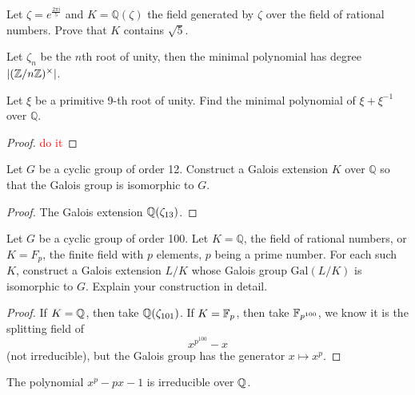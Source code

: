 \begin{prob}[S2002-Q5]
    Let \(\zeta = e^{\frac{2\pi i}{5}}\) and \(K = \mathbb{Q}(\zeta)\) the field generated by \(\zeta\) over the field of rational numbers. Prove that \(K\) contains \(\sqrt{5}\).
\end{prob}

\begin{prop}
    Let $\zeta_n$ be the $n$th root of unity, then the minimal polynomial has degree $|(\mathbb{Z}/n\mathbb{Z})^\times|$. 
\end{prop}

\begin{prob}[S2008-Q2]
    Let \(\xi\) be a primitive 9-th root of unity. Find the minimal polynomial of \(\xi + \xi^{-1}\) over \(\mathbb{Q}\).
\end{prob}
\begin{proof}
    \textcolor{red}{do it}
\end{proof}

\begin{prob}[F2007-Q1]
    Let \(G\) be a cyclic group of order 12. Construct a Galois extension \(K\) over \(\mathbb{Q}\) so that the Galois group is isomorphic to \(G\).
\end{prob}
\begin{proof}
    The Galois extension $\mathbb{Q}(\zeta_{13})$.
\end{proof}


\begin{prob}[F2011-Q3]
    Let \(G\) be a cyclic group of order 100. Let \(K=\mathbb{Q}\), the field of rational numbers, or \(K=F_p\), the finite field with \(p\) elements, \(p\) being a prime number. For each such \(K\), construct a Galois extension \(L/K\) whose Galois group \(\text{Gal}(L/K)\) is isomorphic to \(G\). Explain your construction in detail.
\end{prob}
\begin{proof}
    If $K=\mathbb{Q}$, then take $\mathbb{Q}(\zeta_{101})$. If $K=\mathbb{F}_p$, then take $\mathbb{F}_{p^{100}}$, we know it is the splitting field of 
    \begin{equation*}
        x^{p^{100}}-x
    \end{equation*}
    (not irreducible), but the Galois group has the generator $x\mapsto x^{p}$.
\end{proof}

\begin{prop}
    The polynomial $x^p-px-1$ is irreducible over $\mathbb{Q}$.
\end{prop}



